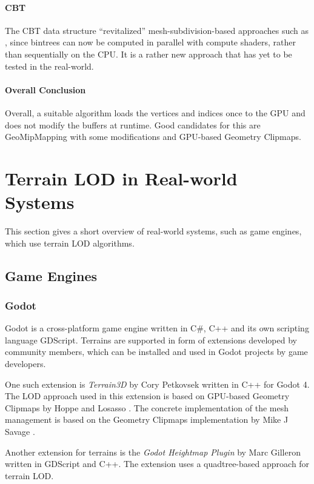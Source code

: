 \paragraph{CBT} The CBT data structure ``revitalized'' mesh-subdivision-based approaches such as \cite{lindstrom1996,roam},
since bintrees can now be computed in parallel with compute shaders, rather than sequentially on the CPU. 
It is a rather new approach that has yet to be tested in the real-world.

\paragraph{Overall Conclusion}
Overall, a suitable algorithm loads the vertices and indices once to the GPU and does not modify 
the buffers at runtime. Good candidates for this are GeoMipMapping with some modifications and 
GPU-based Geometry Clipmaps.

\section{Terrain LOD in Real-world Systems}
This section gives a short overview of real-world systems,
such as game engines, which use terrain LOD algorithms.

\subsection{Game Engines}
\subsubsection{Godot}
Godot is a cross-platform game engine written in C\#, C++ and its own scripting language GDScript.
Terrains are supported in form of extensions developed by community members, 
which can be installed and used in Godot projects by game developers.

One such extension is \textit{Terrain3D} by Cory Petkovsek \cite{godotterrain3dgithub} 
written in C++ for Godot 4. The LOD approach used in this extension is based on 
GPU-based Geometry Clipmaps by Hoppe and Losasso \cite{gpugeomclipmaps}.
The concrete implementation
of the mesh management is based on the Geometry Clipmaps implementation by Mike J Savage \cite{geomclipmapssavage}. 

Another extension for terrains is the \textit{Godot Heightmap Plugin} by Marc Gilleron \cite{godotheightmapplugingithub} written in GDScript and C++.
The extension uses a quadtree-based approach for terrain LOD. 

